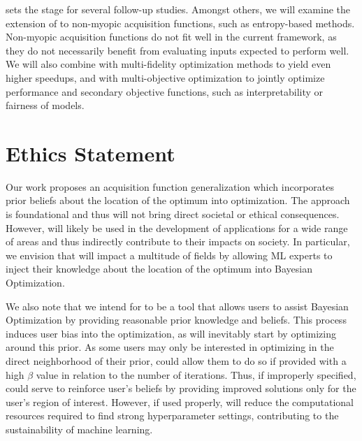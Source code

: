 \documentclass{article}
\newcommand{\danny}[1]{\todo[color=red]{Danny: #1}}
\newcommand{\method}[0]{\text{${\pi}$BO}\xspace}
\begin{document}
\method sets the stage for several follow-up studies. Amongst others, we will examine the extension of \method{} to non-myopic acquisition functions, such as entropy-based methods. Non-myopic acquisition functions do not fit well in the current \method framework, as they do not necessarily benefit from evaluating inputs expected to perform well.
We will also combine \method{} with multi-fidelity optimization methods to yield even higher speedups, and with multi-objective optimization to jointly optimize performance and secondary objective functions, such as interpretability or fairness of models.

\section{Ethics Statement} \label{sec:impact}

Our work proposes an acquisition function generalization which incorporates prior beliefs about the location of the optimum into optimization. The approach is foundational and thus will not bring direct societal or ethical consequences. However, \method will likely be used in the development of applications for a wide range of areas and thus indirectly contribute to their impacts on society. In particular, we envision that \method will impact a multitude of fields by allowing ML experts to inject their knowledge about the location of the optimum into Bayesian Optimization.

We also note that we intend for \method to be a tool that allows users to assist Bayesian Optimization by providing reasonable prior knowledge and beliefs. This process induces user bias into the optimization, as \method will inevitably start by optimizing around this prior. As some users may only be interested in optimizing in the direct neighborhood of their prior, \method{} could allow them to do so if provided with a high $\beta$ value in relation to the number of iterations. Thus, if improperly specified, \method could serve to reinforce user's beliefs by providing improved solutions only for the user's region of interest. However, if used properly, \method{} will reduce the computational resources required to find strong hyperparameter settings, contributing to the sustainability of machine learning.
\end{document}
